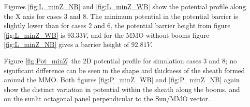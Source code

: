 Figures \ref{fig:L_minZ_NB} and \ref{fig:L_minZ_WB} show the potential profile along the X axis for cases 3 and 8. The minimum potential in the potential barrier is slightly lower than for cases 2 and 6, the potential barrier height from figure \ref{fig:L_minZ_WB} is $93.33 V$, and for the MMO without booms figure \ref{fig:L_minZ_NB} gives a barrier height of $92.81 V$.

Figure \ref{fig:Pot_minZ} the 2D potential profile for simulation cases 3 and 8; no significant difference can be seen in the shape and thickness of the sheath formed around the MMO. Both figures \ref{fig:P_minZ_WB} and \ref{fig:P_minZ_NB} again show the distinct variation in potential within the sheath along the booms, and on the sunlit octagonal panel perpendicular to the Sun/MMO vector. 

